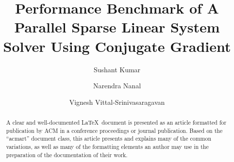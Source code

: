 \documentclass[sigplan,screen]{acmart}
\begin{document}
\title{Performance Benchmark of A Parallel Sparse Linear System Solver Using Conjugate Gradient}

\author{Sushant Kumar}
\authornotemark[1]

\author{Narendra Nanal}
\authornotemark[2]

\author{Vignesh Vittal-Srinivasaragavan}
\authornotemark[3]


\begin{abstract}
  A clear and well-documented \LaTeX\ document is presented as an
  article formatted for publication by ACM in a conference proceedings
  or journal publication. Based on the ``acmart'' document class, this
  article presents and explains many of the common variations, as well
  as many of the formatting elements an author may use in the
  preparation of the documentation of their work.
\end{abstract}

%



\maketitle
\end{document}
